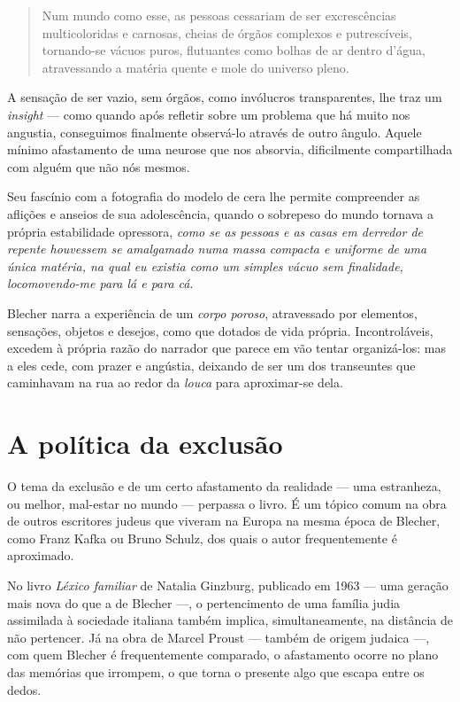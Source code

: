 \begin{quote}
Num mundo como esse, as pessoas cessariam de ser excrescências multicoloridas e carnosas, cheias de órgãos complexos e putrescíveis, tornando-se vácuos puros, flutuantes como bolhas de ar dentro d'água, atravessando a matéria quente e mole do universo pleno.
\end{quote}

A sensação de ser vazio, sem órgãos, como invólucros transparentes, lhe traz um \textit{insight} --- como quando após refletir sobre um problema que há muito nos angustia, conseguimos finalmente observá-lo através de outro ângulo. Aquele mínimo afastamento de uma neurose que nos absorvia, dificilmente compartilhada com alguém que não nós mesmos.

Seu fascínio com a fotografia do modelo de cera lhe permite compreender as aflições e anseios de sua adolescência, quando o sobrepeso do mundo tornava a própria estabilidade opressora, \textit{como se as pessoas e as casas em derredor de repente houvessem se amalgamado numa massa compacta e uniforme de uma única matéria, na qual eu existia como um simples vácuo sem finalidade, locomovendo-me para lá e para cá}.

Blecher narra a experiência de um \textit{corpo poroso}, atravessado por elementos, sensações, objetos e desejos, como que dotados de vida própria. Incontroláveis, excedem à própria razão do narrador que parece em vão tentar organizá-los: mas a eles cede, com prazer e angústia, deixando de ser um dos transeuntes que caminhavam na rua ao redor da \textit{louca} para aproximar-se dela.

\section{A política da exclusão}

O tema da exclusão e de um certo afastamento da realidade --- uma estranheza, ou melhor, mal-estar no mundo --- perpassa o livro. É um tópico comum na obra de outros escritores judeus que viveram na Europa na mesma época de Blecher, como Franz Kafka ou Bruno Schulz, dos quais o autor frequentemente é aproximado. 

No livro \textit{Léxico familiar} de Natalia Ginzburg, publicado em 1963 --- uma geração mais nova do que a de Blecher ---, o pertencimento de uma família judia assimilada à sociedade italiana também implica, simultaneamente, na distância de não pertencer. Já na obra de Marcel Proust --- também de origem judaica ---, com quem Blecher é frequentemente comparado, o afastamento ocorre no plano das memórias que irrompem, o que torna o presente algo que escapa entre os dedos.

